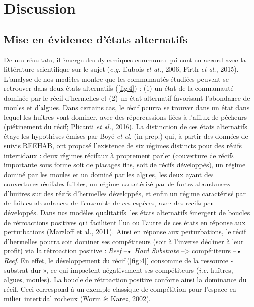 \documentclass[12pt]{report}
\begin{document}
\chapter{Discussion}
    \section{Mise en évidence d'états alternatifs}
        
De nos résultats, il émerge des dynamiques communes qui sont en accord avec la littérature scientifique sur le sujet (\textit{e.g.} Dubois \textit{et al.}, 2006, Firth \textit{et al.}, 2015). L’analyse de nos modèles montre que les communautés étudiées peuvent se retrouver dans deux états alternatifs (\autoref{fig:4}) : (1) un état de la communauté dominée par le récif d’hermelles et (2) un état alternatif favorisant l’abondance de moules et d’algues. Dans certains cas, le récif pourra se trouver dans un état dans lequel les huîtres vont dominer, avec des répercussions liées à l’afflux de pécheurs (piétinement du récif; Plicanti \textit{et al.}, 2016). La distinction de ces états alternatifs étaye les hypothèses émises par Boyé \textit{et al.} (in prep.) qui, à partir des données de suivis REEHAB, ont proposé l'existence de six régimes distincts pour des récifs intertidaux : deux régimes récifaux à proprement parler (couverture de récifs importante sous forme soit de placages fins, soit de récifs développés), un régime dominé par les moules et un dominé par les algues, les deux ayant des couvertures récifales faibles, un régime caractérisé par de fortes abondances d’huitres sur des récifs d’hermelles développés, et enfin un régime caractérisé par de faibles abondances de l’ensemble de ces espèces, avec des récifs peu développés. 
\newline \newline
Dans nos modèles qualitatifs, les états alternatifs émergent de boucles de rétroactions positives qui facilitent l’un ou l’autre de ces états en réponse aux perturbations (Marzloff et al., 2011). Ainsi en réponse aux perturbations, le récif d’hermelles pourra soit dominer ses compétiteurs (soit à l'inverse décliner à leur profit) via la rétroaction positive : \textit{Reef} --• \textit{Hard Substrate} --> compétiteurs --• \textit{Reef}. En effet, le développement du récif (\autoref{fig:4}) consomme de la ressource « substrat dur », ce qui impactent négativement ses compétiteurs (\textit{i.e.} huîtres, algues, moules). La boucle de rétroaction positive conforte ainsi la dominance du récif. Ceci correspond à un exemple classique de compétition pour l'espace en milieu intertidal rocheux (Worm \& Karez, 2002). 
\end{document}
